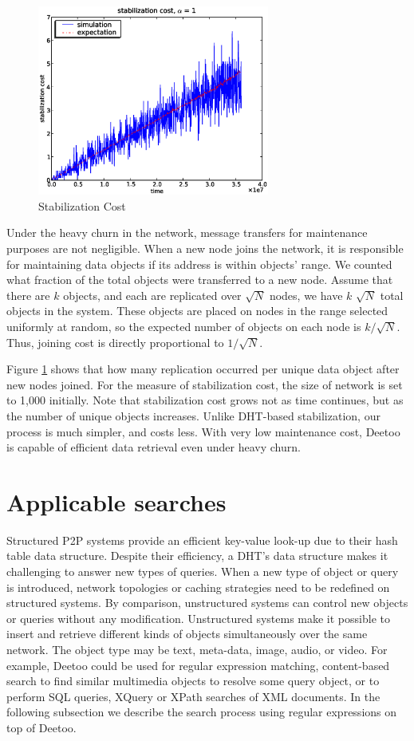 \documentclass[conference]{IEEEtran}
\begin{document}
\begin{figure}
\centering
\includegraphics[width=3in]{stab_cost}
\caption{Stabilization Cost} \label{fig:stab_cost}
\end{figure}
Under the heavy churn in the network, message transfers for maintenance purposes
are not negligible. When a new node joins the network, it
is responsible for maintaining data objects if its address is within 
objects' range.
We counted what fraction of the total objects were transferred to a new node.
Assume that there are $k$ objects, and each are replicated over 
$\sqrt{N}$ nodes, we have $k$ $\sqrt{N}$ total objects in the system.
These objects are placed on nodes in the range selected uniformly at random, 
so the expected number of objects on each node is $k/\sqrt{N}$. 
Thus, joining cost is directly proportional to $1/\sqrt{N}$.

Figure \ref{fig:stab_cost} shows that how many replication occurred per unique
data object after new nodes joined. 
For the measure of stabilization cost, 
the size of network is set to 1,000 initially. 
Note that stabilization cost grows not as time continues, but as the number of unique 
objects increases.
Unlike DHT-based stabilization, our process is much simpler, and costs less.
With very low maintenance cost, Deetoo is capable of efficient data retrieval 
even under heavy churn.

\iffalse
\section{Applicable searches}
Structured P2P systems provide an efficient key-value look-up due to 
their hash table data structure.
Despite their efficiency, a DHT's data structure makes it challenging to answer new
types of queries.
When a new type of object or query is introduced, network topologies or 
caching strategies need to be redefined on structured systems. By comparison, 
unstructured systems can control new objects or queries without any modification. 
Unstructured systems make it possible to insert and retrieve 
different kinds of objects simultaneously over the same network.
The object type may be text, meta-data, image, audio, or video.
For example, Deetoo could be used for regular expression
matching, content-based search to find similar multimedia objects to
resolve some query object, or to perform SQL queries, XQuery or XPath searches of XML
documents. In the following subsection we describe the search process using 
regular expressions on top of Deetoo.
 
\end{document}
